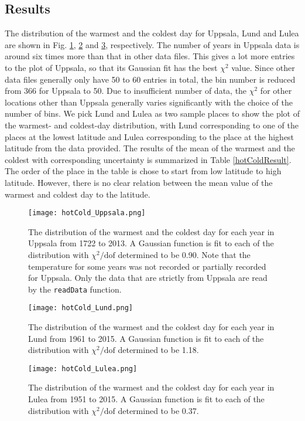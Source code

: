 \subsection{Results}
The distribution of the warmest and the coldest day for Uppsala, Lund and Lulea are shown in Fig. \ref{hotColdUppsala}, \ref{hotColdLund} and \ref{hotColdLulea}, respectively. The number of years in Uppsala data is around six times more than that in other data files. This gives a lot more entries to the plot of Uppsala, so that its Gaussian fit has the best $\chi^2$ value. Since other data files generally only have 50 to 60 entries in total, the bin number is reduced from 366 for Uppsala to 50. Due to insufficient number of data, the $\chi^2$ for other locations other than Uppsala generally varies significantly with the choice of the number of bins. We pick Lund and Lulea as two sample places to show the plot of the warmest- and coldest-day distribution, with Lund corresponding to one of the places at the lowest latitude and Lulea corresponding to the place at the highest latitude from the data provided. The results of the mean of the warmest and the coldest with corresponding uncertainty is summarized in Table \ref{hotColdResult}. The order of the place in the table is chose to start from low latitude to high latitude. However, there is no clear relation between the mean value of the warmest and coldest day to the latitude. 

\begin{figure}[H]
\centering
\texttt{[image: hotCold\_Uppsala.png]}
\caption{The distribution of the warmest and the coldest day for each year in Uppsala from 1722 to 2013. A Gaussian function is fit to each of the distribution with $\chi^2/\text{dof}$ determined to be 0.90. Note that the temperature for some years was not recorded or partially recorded for Uppsala. Only the data that are strictly from Uppsala are read by the \texttt{readData} function. }
\label{hotColdUppsala}
\end{figure}

\begin{figure}[H]
\centering
\texttt{[image: hotCold\_Lund.png]}
\caption{The distribution of the warmest and the coldest day for each year in Lund from 1961 to 2015. A Gaussian function is fit to each of the distribution with $\chi^2/\text{dof}$ determined to be 1.18.}
\label{hotColdLund}
\end{figure}

\begin{figure}[H]
\centering
\texttt{[image: hotCold\_Lulea.png]}
\caption{The distribution of the warmest and the coldest day for each year in Lulea from 1951 to 2015. A Gaussian function is fit to each of the distribution with $\chi^2/\text{dof}$ determined to be 0.37.}
\label{hotColdLulea}
\end{figure}

